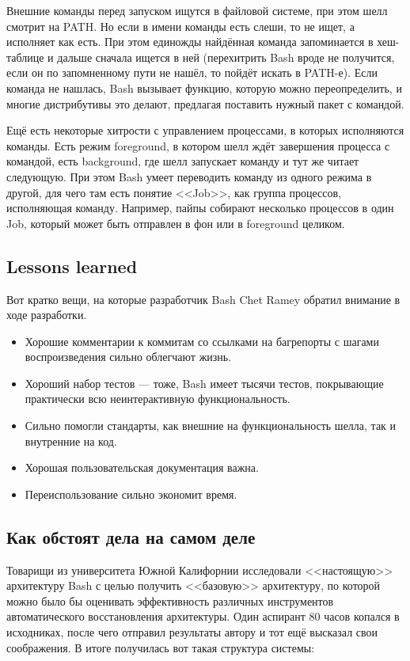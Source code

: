 \documentclass[a5paper]{article}
\begin{document}
Внешние команды перед запуском ищутся в файловой системе, при этом шелл смотрит на PATH. Но если в имени команды есть слеши, то не  ищет, а исполняет как есть. При этом единожды найдённая команда запоминается в хеш-таблице и дальше сначала ищется в ней (перехитрить Bash вроде не получится, если он по запомненному пути не нашёл, то пойдёт искать в PATH-е). Если команда не нашлась, Bash вызывает функцию, которую можно переопределить, и многие дистрибутивы это делают, предлагая поставить нужный пакет с командой.

Ещё есть некоторые хитрости с управлением процессами, в которых исполняются команды. Есть режим foreground, в котором шелл ждёт завершения процесса с командой, есть background, где шелл запускает команду и тут же читает следующую. При этом Bash умеет переводить команду из одного режима в другой, для чего там есть понятие <<Job>>, как группа процессов, исполняющая команду. Например, пайпы собирают несколько процессов в один Job, который может быть отправлен в фон или в foreground целиком.

\subsection{Lessons learned}

Вот кратко вещи, на которые разработчик Bash Chet Ramey обратил внимание в ходе разработки.

\begin{itemize}
    \item Хорошие комментарии к коммитам со ссылками на багрепорты с шагами воспроизведения сильно облегчают жизнь.
    \item Хороший набор тестов --- тоже, Bash имеет тысячи тестов, покрывающие практически всю неинтерактивную функциональность.
    \item Сильно помогли стандарты, как внешние на функциональность шелла, так и внутренние на код.
    \item Хорошая пользовательская документация важна.
    \item Переиспользование сильно экономит время.
\end{itemize}

\subsection{Как обстоят дела на самом деле}

Товарищи из университета Южной Калифорнии исследовали <<настоящую>> архитектуру Bash с целью получить <<базовую>> архитектуру, по которой можно было бы оценивать эффективность различных инструментов автоматического восстановления архитектуры. Один аспирант 80 часов копался в исходниках, после чего отправил результаты автору и тот ещё высказал свои соображения. В итоге получилась вот такая структура системы:
\end{document}
